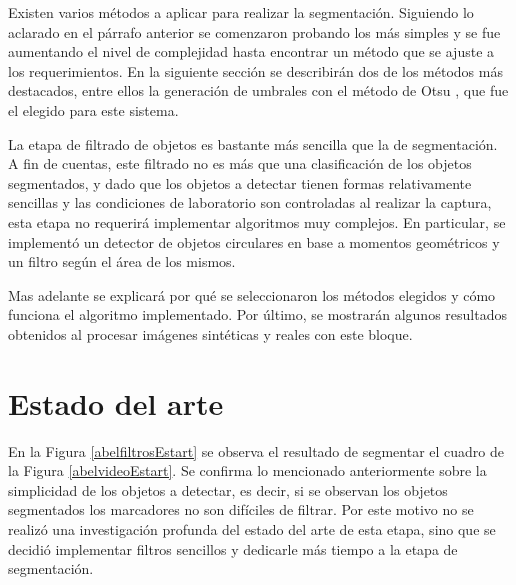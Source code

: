 Existen varios métodos a aplicar para realizar la segmentación. Siguiendo lo aclarado en el párrafo anterior se comenzaron probando los más simples y se fue aumentando el nivel de complejidad hasta encontrar un método que se ajuste a los requerimientos. En la siguiente sección se describirán dos de los métodos más destacados, entre ellos la generación de umbrales con el método de Otsu \cite{otsu}, que fue el elegido para este sistema.

La etapa de filtrado de objetos es bastante más sencilla que la de segmentación. A fin de cuentas, este filtrado no es más que una clasificación de los objetos segmentados, y dado que los objetos a detectar tienen formas relativamente sencillas y las condiciones de laboratorio son controladas al realizar la captura, esta etapa no requerirá implementar algoritmos muy complejos. En particular, se implementó un detector de objetos circulares en base a momentos geométricos y un filtro según el área de los mismos.

Mas adelante se explicará por qué se seleccionaron los métodos elegidos y cómo funciona el algoritmo implementado. Por último, se mostrarán algunos resultados obtenidos al procesar imágenes sintéticas y reales con este bloque.

\section{Estado del arte}%
\label{segEstArt}

En la Figura \ref{abelfiltrosEstart} se observa el resultado de segmentar el cuadro de la Figura \ref{abelvideoEstart}. Se confirma lo mencionado anteriormente sobre la simplicidad de los objetos a detectar, es decir, si se observan los objetos segmentados los marcadores no son difíciles de filtrar. Por este motivo no se realizó una investigación profunda del estado del arte de esta etapa, sino que se decidió implementar filtros sencillos y dedicarle más tiempo a la etapa de segmentación.


